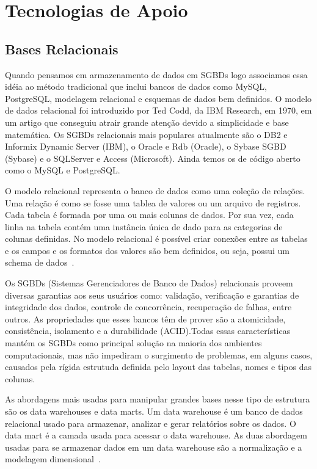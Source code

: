 \section{Tecnologias de Apoio}
\subsection{Bases Relacionais}

Quando pensamos em armazenamento de dados em SGBDs logo associamos essa idéia ao método tradicional que inclui bancos de dados como MySQL, PostgreSQL, modelagem relacional e esquemas de dados bem definidos. O modelo de dados relacional foi introduzido por Ted Codd, da IBM Research, em 1970, em um artigo que conseguiu atrair grande atenção devido a simplicidade e base matemática. Os SGBDs relacionais mais populares atualmente são o DB2 e Informix Dynamic Server (IBM), o Oracle e Rdb (Oracle), o Sybase SGBD (Sybase) e o SQLServer e Access (Microsoft). Ainda temos os de código aberto como o MySQL e PostgreSQL.

O modelo relacional representa o banco de dados como uma coleção de relações. Uma relação é como se fosse uma tablea de valores ou um arquivo de registros. Cada tabela é formada por uma ou mais colunas de dados. Por sua vez, cada linha na tabela contém uma instância única de dado para as categorias de colunas definidas. No modelo relacional é possível criar conexões entre as tabelas e os  campos e os formatos dos valores são bem definidos, ou seja, possui um schema de dados~\cite{SBElmasri,nosqlliveup}.

Os SGBDs (Sistemas Gerenciadores de Banco de Dados) relacionais proveem diversas garantias aos seus usuários como: validação, verificação e garantias de integridade dos dados, controle de concorrência, recuperação de falhas,  entre outros. As propriedades que esses bancos têm de prover são a atomicidade, consistência, isolamento e a durabilidade (ACID).Todas essas características mantém os SGBDs como principal solução na maioria dos ambientes computacionais, mas não impediram o surgimento de problemas, em alguns casos, causados pela rígida estrutuda definida pelo layout das tabelas, nomes e tipos das colunas.

As abordagens mais usadas para manipular grandes bases nesse tipo de estrutura são os data warehouses e data marts. Um data warehouse é um banco de dados relacional usado para armazenar, analizar e gerar relatórios sobre os dados. O data mart é a camada usada para acessar o data warehouse. As duas abordagem usadas para se armazenar dados em um data warehouse são a normalização e a modelagem dimensional~\cite{bigdataarchitectureandapproach}.

